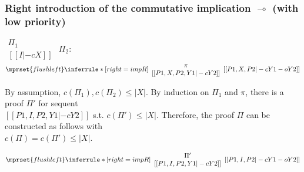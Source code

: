 \subsubsection{Right introduction of the commutative implication $\multimap$ (with low priority)}
\begin{center}
  \scriptsize
  \begin{math}
    \begin{array}{c}
      \Pi_1 \\
      {[[I |-c X]]}
    \end{array}
  \end{math}
  \qquad\qquad
  $\Pi_2$:
  \begin{math}
    $$\mprset{flushleft}
    \inferrule* [right={\tiny impR}] {
      {
        \begin{array}{c}
          \pi \\
          {[[P1, X, P2, Y1 |-c Y2]]}
        \end{array}
      }
    }{[[P1, X, P2 |-c Y1 -o Y2]]}
  \end{math}
\end{center}
By assumption, $c(\Pi_1),c(\Pi_2)\leq |X|$. By induction on $\Pi_1$
and $\pi$, there is a proof $\Pi'$ for sequent \\
$[[P1, I, P2, Y1 |-c Y2]]$ s.t. $c(\Pi') \leq |X|$. Therefore, the
proof $\Pi$ can be constructed as follows with \\
$c(\Pi) = c(\Pi') \leq |X|$.
\begin{center}
  \scriptsize
  \begin{math}
    $$\mprset{flushleft}
    \inferrule* [right={\tiny impR}] {
      {
        \begin{array}{c}
          \Pi' \\
          {[[P1, I, P2, Y1 |-c Y2]]}
        \end{array}
      }
    }{[[P1, I, P2 |-c Y1 -o Y2]]}
  \end{math}
\end{center}



